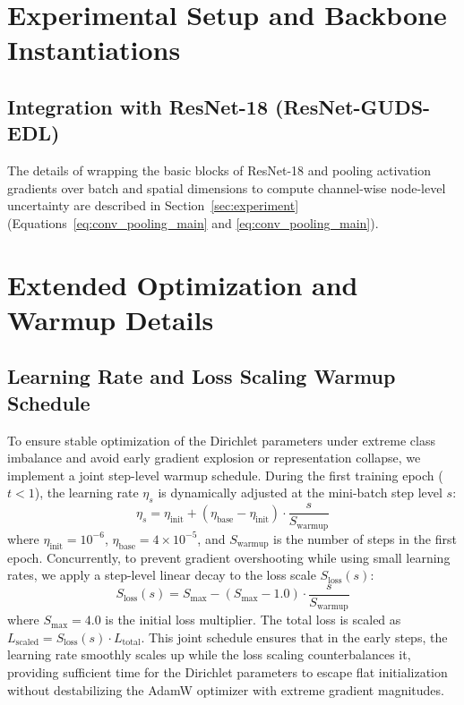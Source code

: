 \documentclass[letterpaper]{article} %
\begin{document}
\section{Experimental Setup and Backbone Instantiations}\label{sec:experimental_setup}
\subsection{Integration with ResNet-18 (ResNet-GUDS-EDL)}\label{subsec:resnet}
The details of wrapping the basic blocks of ResNet-18 and pooling activation gradients over batch and spatial dimensions to compute channel-wise node-level uncertainty are described in Section~\ref{sec:experiment} (Equations~\ref{eq:conv_pooling_main} and \ref{eq:conv_pooling_main}).

\section{Extended Optimization and Warmup Details}
\subsection{Learning Rate and Loss Scaling Warmup Schedule}\label{subsec:warmup}
To ensure stable optimization of the Dirichlet parameters under extreme class imbalance and avoid early gradient explosion or representation collapse, we implement a joint step-level warmup schedule. During the first training epoch ($t < 1$), the learning rate $\eta_s$ is dynamically adjusted at the mini-batch step level $s$:
\begin{equation}\label{eq:warmup}
    \eta_s = \eta_{\text{init}} + (\eta_{\text{base}} - \eta_{\text{init}}) \cdot \frac{s}{S_{\text{warmup}}}
\end{equation}
where $\eta_{\text{init}} = 10^{-6}$, $\eta_{\text{base}} = 4 \times 10^{-5}$, and $S_{\text{warmup}}$ is the number of steps in the first epoch. Concurrently, to prevent gradient overshooting while using small learning rates, we apply a step-level linear decay to the loss scale $S_{\text{loss}}(s)$:
\begin{equation}\label{eq:loss_warmup}
    S_{\text{loss}}(s) = S_{\text{max}} - (S_{\text{max}} - 1.0) \cdot \frac{s}{S_{\text{warmup}}}
\end{equation}
where $S_{\text{max}} = 4.0$ is the initial loss multiplier. The total loss is scaled as $L_{\text{scaled}} = S_{\text{loss}}(s) \cdot L_{\text{total}}$. This joint schedule ensures that in the early steps, the learning rate smoothly scales up while the loss scaling counterbalances it, providing sufficient time for the Dirichlet parameters to escape flat initialization without destabilizing the AdamW optimizer with extreme gradient magnitudes.
\end{document}
